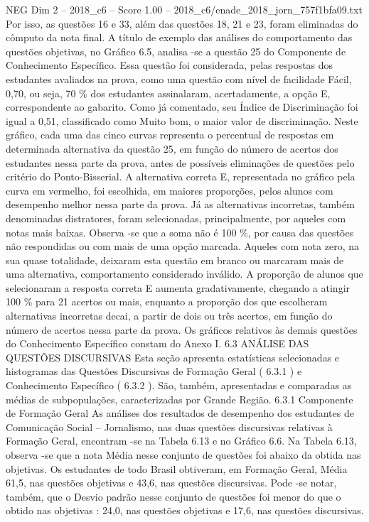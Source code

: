 \begin{textsample}{NEG Dim 2 – 2018\_c6 – Score 1.00 – 2018\_c6/enade\_2018\_jorn\_757f1bfa09.txt}
Por isso, as questões 16 e 33, além das questões 18, 21 e 23, foram eliminadas do cômputo da nota final.
A título de exemplo das análises do comportamento das questões objetivas, no Gráfico 6.5, analisa -se a questão 25 do Componente de Conhecimento Específico.
Essa questão foi considerada, pelas respostas dos estudantes avaliados na prova, como uma questão com nível de facilidade Fácil, 0,70, ou seja, 70 \% dos estudantes assinalaram, acertadamente, a opção E, correspondente ao gabarito.
Como já comentado, seu Índice de Discriminação foi igual a 0,51, classificado como Muito bom, o maior valor de discriminação.
Neste gráfico, cada uma das cinco curvas representa o percentual de respostas em determinada alternativa da questão 25, em função do número de acertos dos estudantes nessa parte da prova, antes de possíveis eliminações de questões pelo critério do Ponto-Bisserial.
A alternativa correta E, representada no gráfico pela curva em vermelho, foi escolhida, em maiores proporções, pelos alunos com desempenho melhor nessa parte da prova.
Já as alternativas incorretas, também denominadas distratores, foram selecionadas, principalmente, por aqueles com notas mais baixas.
Observa -se que a soma não é 100 \%, por causa das questões não respondidas ou com mais de uma opção marcada.
Aqueles com nota zero, na sua quase totalidade, deixaram esta questão em branco ou marcaram mais de uma alternativa, comportamento considerado inválido.
A proporção de alunos que selecionaram a resposta correta E aumenta gradativamente, chegando a atingir 100 \% para 21 acertos ou mais, enquanto a proporção dos que escolheram alternativas incorretas decai, a partir de dois ou três acertos, em função do número de acertos nessa parte da prova.
Os gráficos relativos às demais questões do Conhecimento Específico constam do Anexo I. 6.3 ANÁLISE DAS QUESTÕES DISCURSIVAS Esta seção apresenta estatísticas selecionadas e histogramas das Questões Discursivas de Formação Geral ( 6.3.1 ) e Conhecimento Específico ( 6.3.2 ).
São, também, apresentadas e comparadas as médias de subpopulações, caracterizadas por Grande Região. 6.3.1 Componente de Formação Geral As análises dos resultados de desempenho dos estudantes de Comunicação Social – Jornalismo, nas duas questões discursivas relativas à Formação Geral, encontram -se na Tabela 6.13 e no Gráfico 6.6.
Na Tabela 6.13, observa -se que a nota Média nesse conjunto de questões foi abaixo da obtida nas objetivas.
Os estudantes de todo Brasil obtiveram, em Formação Geral, Média 61,5, nas questões objetivas e 43,6, nas questões discursivas.
Pode -se notar, também, que o Desvio padrão nesse conjunto de questões foi menor do que o obtido nas objetivas : 24,0, nas questões objetivas e 17,6, nas questões discursivas.

\end{textsample}
